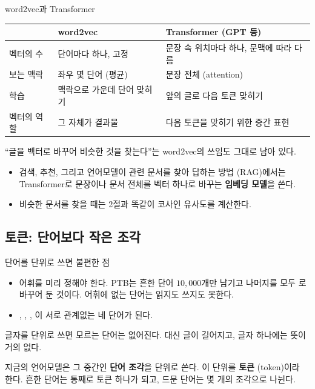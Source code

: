 \documentclass[aspectratio=169,11pt]{beamer}
\begin{document}
\begin{frame}{word2vec과 Transformer}
\begin{center}
\small
\begin{tabular}{@{}lll@{}}
\toprule
& word2vec & Transformer (GPT 등) \\
\midrule
벡터의 수 & 단어마다 하나, 고정 & 문장 속 위치마다 하나, 문맥에 따라 다름 \\
보는 맥락 & 좌우 몇 단어 (평균) & 문장 전체 (attention) \\
학습 & 맥락으로 가운데 단어 맞히기 & 앞의 글로 다음 토큰 맞히기 \\
벡터의 역할 & 그 자체가 결과물 & 다음 토큰을 맞히기 위한 중간 표현 \\
\bottomrule
\end{tabular}
\end{center}
\vskip3mm
``글을 벡터로 바꾸어 비슷한 것을 찾는다''는 word2vec의 쓰임도 그대로 남아 있다.
\begin{itemize}
\item 검색, 추천, 그리고 언어모델이 관련 문서를 찾아 답하는 방법 (RAG)에서는
  Transformer로 문장이나 문서 전체를 벡터 하나로 바꾸는 \textbf{임베딩 모델}을 쓴다.
\item 비슷한 문서를 찾을 때는 2절과 똑같이 코사인 유사도를 계산한다.
\end{itemize}
\end{frame}

\subsection{토큰: 단어보다 작은 조각}

\begin{frame}{단어를 단위로 쓰면 불편한 점}
\begin{itemize}
\item 어휘를 미리 정해야 한다.
  PTB는 흔한 단어 $10{,}000$개만 남기고 나머지를 모두 로 바꾸어 둔 것이다.
  어휘에 없는 단어는 읽지도 쓰지도 못한다.
\item {}, , , 이 서로 관계없는 네 단어가 된다.
\end{itemize}
\vskip1mm
글자를 단위로 쓰면 모르는 단어는 없어진다.
대신 글이 길어지고, 글자 하나에는 뜻이 거의 없다.
\vskip2mm
\begin{keybox}[토큰]
지금의 언어모델은 그 중간인 \textbf{단어 조각}을 단위로 쓴다.
이 단위를 \textbf{토큰} (token)이라 한다.
흔한 단어는 통째로 토큰 하나가 되고, 드문 단어는 몇 개의 조각으로 나뉜다.
\end{keybox}
\end{frame}
\end{document}
